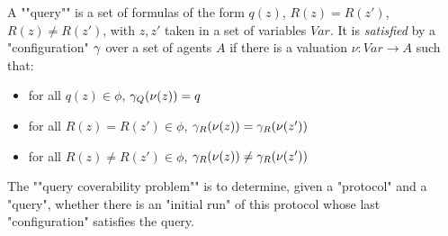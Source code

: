 \begin{definition}
	A ""query"" is a set of formulas of the form $q(z)$, $R(z) = R(z')$, $R(z) \neq R(z')$, with $z, z'$ taken in a set of variables $Var$.
	It is \emph{satisfied} by a "configuration" $\gamma$ over a set of agents $A$ if there is a valuation $\nu : Var \to A$ such that:
	\begin{itemize}
		\item for all $q(z) \in \phi$, $\gamma_Q(\nu(z)) = q$
		
		\item for all $R(z) = R(z') \in \phi$, $\gamma_R(\nu(z)) = \gamma_R(\nu(z'))$
		
		\item for all $R(z) \neq R(z') \in \phi$, $\gamma_R(\nu(z)) \neq \gamma_R(\nu(z'))$
	\end{itemize}

	\AP The ""query coverability problem"" is to determine, given a "protocol" and a "query", whether there is an "initial run" of this protocol whose last "configuration" satisfies the query.
\end{definition}



